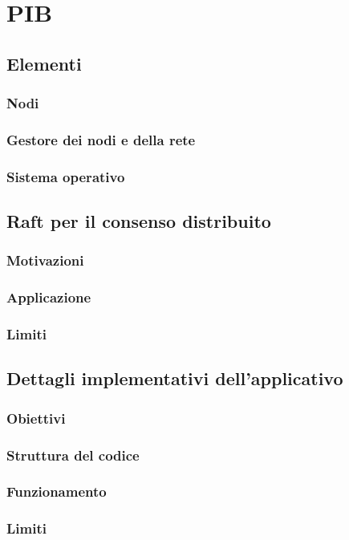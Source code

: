 
\section{PIB}
\subsection{Elementi}
\subsubsection{Nodi}

\subsubsection{Gestore dei nodi e della rete}

\subsubsection{Sistema operativo}

\subsection{Raft per il consenso distribuito}
\subsubsection{Motivazioni}

\subsubsection{Applicazione}

\subsubsection{Limiti}

\subsection{Dettagli implementativi dell'applicativo}
\subsubsection{Obiettivi}

\subsubsection{Struttura del codice}

\subsubsection{Funzionamento}

\subsubsection{Limiti}
